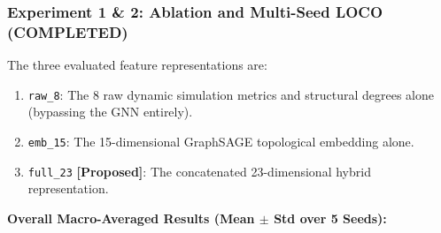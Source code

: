 \documentclass[11pt,a4paper]{article}
\begin{document}
\subsubsection*{Experiment 1 \& 2: Ablation and Multi-Seed LOCO (COMPLETED)}

The three evaluated feature representations are:
\begin{enumerate}[leftmargin=*]
    \item \texttt{raw\_8}: The 8 raw dynamic simulation metrics and structural degrees alone (bypassing the GNN entirely).
    \item \texttt{emb\_15}: The 15-dimensional GraphSAGE topological embedding alone.
    \item \texttt{full\_23} \textbf{[Proposed]}: The concatenated 23-dimensional hybrid representation.
\end{enumerate}

\textbf{Overall Macro-Averaged Results (Mean $\pm$ Std over 5 Seeds):}
\end{document}
